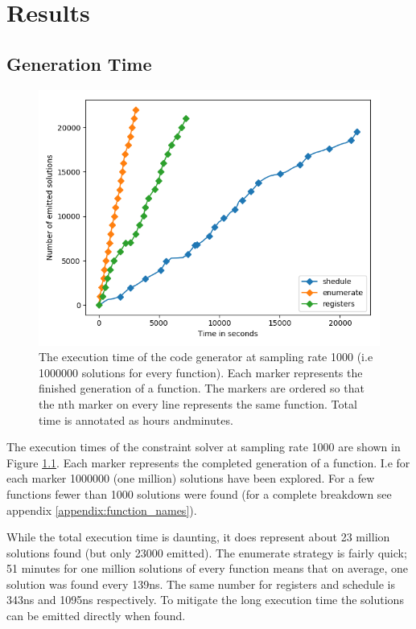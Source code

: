 \chapter{Results}

\section{Generation Time}

\begin{figure}[h]
	\centering
	\includegraphics[width=\textwidth,height=0.5\textheight]{results/figures/generator_time}
	\caption{The execution time of the code generator at sampling rate 1000 (i.e 1000000 solutions for every function). Each marker represents the finished generation of a function. The markers are ordered so that the nth marker on every line represents the same function. Total time is annotated as hours andminutes.}
	\label{fig:time}
\end{figure}

The execution times of the constraint solver at sampling rate 1000 are shown in Figure
\ref{fig:time}. Each marker represents the completed generation of a function. I.e for each
marker 1000000 (one million) solutions have been explored. For a few functions fewer than
1000 solutions were found (for a complete breakdown see appendix \ref{appendix:function_names}).

While the total execution time is daunting, it does represent about 23 million solutions
found (but only 23000 emitted). The enumerate strategy is fairly quick; 51 minutes for one
million solutions of every function means that on average, one solution was found every
139ns. The same number for registers and schedule is 343ns and 1095ns respectively. To
mitigate the long execution time the solutions can be emitted directly when found.

